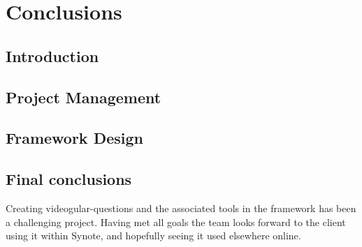\chapter{Conclusions} \label{Chapter: Conclusions}



\section{Introduction}



\section{Project Management}



\section{Framework Design}


\section{Final conclusions}

Creating videogular-questions and the associated tools in the framework has been a challenging project. Having met all goals the team looks forward to the client using it within Synote, and hopefully seeing it used elsewhere online. 
